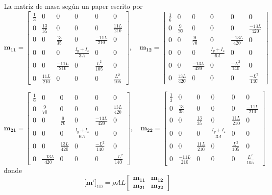 \documentclass[11pt, a4paper,titlepage]{article}
\newcommand{\Mme}[1]{\boldsymbol{[}\mathbf{#1} \boldsymbol{]}}
\begin{document}
La matriz de masa según un paper escrito por \cite{matas2014study}
\[ \pmb{m_{11}}=
\left[\begin{array}{cccccc}{\frac{1}{3}} & {0} & {0} & {0} & {0} & {0} \\ {0} & {\frac{13}{35}} & {0} & {0} & {0} & {\frac{11 L}{210}} \\ {0} & {0} & {\frac{13}{35}} & {0} & {\frac{-11 L}{210}} & {0} \\ {0} & {0} & {0} & {\frac{I_{y}+I_{z}}{3 A}} & {0} & {0} \\ {0} & {0} & {\frac{-11 L}{210}} & {0} & {\frac{L^{2}}{105}} & {0} \\ {0} & {\frac{11 L}{210}} & {0} & {0} & {0} & {\frac{L^{2}}{105}}\end{array}\right], \quad \pmb{m_{12}}= \left[\begin{array}{cccccc}{\frac{1}{6}} & {0} & {0} & {0} & {0} & {0} \\ {0} & {\frac{9}{70}} & {0} & {0} & {0} & {\frac{-13 L}{420}} \\ {0} & {0} & {\frac{9}{70}} & {0} & {\frac{-13 L}{420}} & {0} \\ {0} & {0} & {0} & {\frac{I_{y}+I_{z}}{6 A}} & {0} & {0} \\ {0} & {0} & {\frac{-13 L}{420}} & {0} & {\frac{-L^{2}}{140}} & {0} \\ {0} & {\frac{13 L}{420}} & {0} & {0} & {0} & {\frac{-L^{2}}{140}}\end{array}\right]
\]

\[
\pmb{m_{21}} = \left[\begin{array}{cccccc}{\frac{1}{6}} & {0} & {0} & {0} & {0} & {0} \\ {0} & {\frac{9}{70}} & {0} & {0} & {0} & {\frac{13 L}{420}} \\ {0} & {0} & {\frac{9}{70}} & {0} & {\frac{-13 L}{420}} & {0} \\ {0} & {0} & {0} & {\frac{I_{y}+I_{z}}{6 A}} & {0} & {0} \\ {0} & {0} & {\frac{13 L}{420}} & {0} & {\frac{-L^{2}}{140}} & {0} \\ {0} & {\frac{-13 L}{420}} & {0} & {0} & {0} & {\frac{-L^{2}}{140}}\end{array}\right], \quad \pmb{m_{22}} = \left[\begin{array}{cccccc}{\frac{1}{3}} & {0} & {0} & {0} & {0} & {0} \\ {0} & {\frac{13}{35}} & {0} & {0} & {0} & {\frac{-11 L}{210}} \\ {0} & {0} & {\frac{13}{35}} & {0} & {\frac{11 L}{210}} & {0} \\ {0} & {0} & {0} & {\frac{I_{y}+I_{z}}{3 A}} & {0} & {0} \\ {0} & {0} & {\frac{11 L}{210}} & {0} & {\frac{L^{2}}{105}} & {0} \\ {0} & {\frac{-11 L}{210}} & {0} & {0} & {0} & {\frac{L^{2}}{105}}\end{array}\right]
\]
donde
\begin{equation}
	\Mme{m'}_{\mathrm{1D}}= \rho A L \left[\begin{array}{cc}
	\pmb{m_{11}}  &  \pmb{m_{12}} \\
	\pmb{m_{21}}  &  \pmb{m_{22}} 
	\end{array}\right]
\end{equation}
\end{document}
